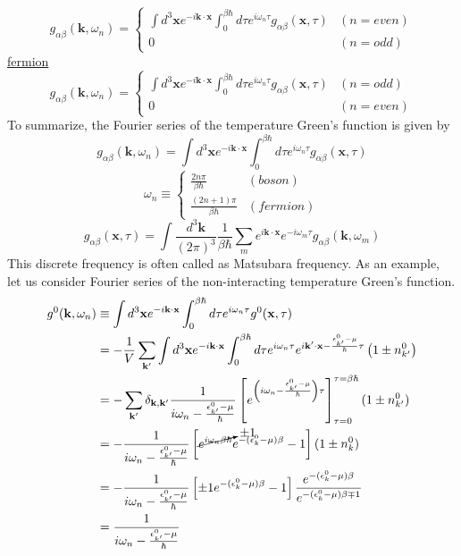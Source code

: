 $$
g_{\alpha\beta}(\mathbf{k},\omega_n)=
\begin{cases}
\int d^3 \mathbf{x} e^{-i\mathbf{k}\cdot\mathbf{x}}\int_0^{\beta\hbar} d\tau e^{i\omega_n\tau} g_{\alpha\beta}(\mathbf{x},\tau)&(n=even)\\
0&(n=odd)
\end{cases}
$$
\uline{fermion}
$$
g_{\alpha\beta}(\mathbf{k},\omega_n)=
\begin{cases}
\int d^3 \mathbf{x} e^{-i\mathbf{k}\cdot\mathbf{x}}\int_0^{\beta\hbar} d\tau e^{i\omega_n\tau} g_{\alpha\beta}(\mathbf{x},\tau)&(n=odd)\\
0&(n=even)
\end{cases}
$$
To summarize, the Fourier series of the temperature Green's function is given by
\begin{equation}\label{4.4.13}
g_{\alpha\beta}(\mathbf{k},\omega_n)=\int d^3\mathbf{x} e^{-i\mathbf{k}\cdot\mathbf{x}} \int_0^{\beta\hbar} d\tau e^{i\omega_n\tau}g_{\alpha\beta}(\mathbf{x},\tau)
\end{equation}
\begin{equation}
\omega_n\equiv
\begin{cases}
\frac{2n\pi}{\beta\hbar} &(boson)\\
\frac{(2n+1)\pi}{\beta\hbar} &(fermion)
\end{cases}
\end{equation}
\begin{equation}
g_{\alpha\beta}(\mathbf{x},\tau)=\int \frac{d^3\mathbf{k}}{(2\pi)^3} \frac{1}{\beta\hbar} \sum_m e^{i\mathbf{k}\cdot\mathbf{x}} e^{-i\omega_m\tau}g_{\alpha\beta}(\mathbf{k},\omega_m)
\end{equation}
This discrete frequency is often called as Matsubara frequency.
As an example, let us consider Fourier series of the non-interacting temperature Green's function.
\begin{equation}
\begin{aligned}
g^0(\mathbf{k},\omega_n)&\equiv \int d^3\mathbf{x} e^{-i\mathbf{k}\cdot\mathbf{x}} \int_0^{\beta\hbar} d\tau e^{i\omega_n\tau} g^0(\mathbf{x},\tau)\\
&=-\frac{1}{V}\sum_{\mathbf{k}'} \int d^3\mathbf{x} e^{-i\mathbf{k}\cdot\mathbf{x}} \int_0^{\beta\hbar} d\tau e^{i\omega_n\tau} e^{i\mathbf{k}'\cdot\mathbf{x}-\frac{\epsilon^0_{k'}-\mu}{\hbar}\tau} \left(1\pm n_{k'}^0\right)\\
&=-\sum_{\mathbf{k}'} \delta_{\mathbf{k},\mathbf{k}'} \frac{1}{i\omega_n-\frac{\epsilon^0_{k'}-\mu}{\hbar}}\left[e^{\left(i\omega_n-\frac{\epsilon^0_{k'}-\mu}{\hbar}\right)\tau}\right]_{\tau=0}^{\tau=\beta\hbar}(1\pm n_{k'}^0)\\
&=-\frac{1}{i\omega_n-\frac{\epsilon^0_{k'}-\mu}{\hbar}}\left[\cancelto{\pm1}{e^{i\omega_n\beta\hbar}} e^{-(\epsilon_k^0-\mu)\beta}-1\right] (1\pm n_k^0)\\
&=-\frac{1}{i\omega_n-\frac{\epsilon^0_{k'}-\mu}{\hbar}}\left[\pm1 e^{-(\epsilon_k^0-\mu)\beta}-1\right] \frac{e^{-(\epsilon_k^0-\mu)\beta}}{e^{-(\epsilon_k^0-\mu)\beta\mp1}}\\
&=\frac{1}{i\omega_n-\frac{\epsilon^0_{k'}-\mu}{\hbar}}
\end{aligned}
\end{equation}
